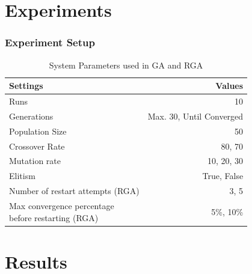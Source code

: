 \documentclass[10pt]{beamer}
\begin{document}
\section{Experiments}

\begin{frame}
	\frametitle{Experiment Setup}

	\begin{table}
		\caption{System Parameters used in GA and RGA}
		\begin{tabular}{ | l | r | }
		  \hline
		    Settings & Values \\ \hline \hline
		    Runs & 10 \\ \hline
		    Generations & Max. 30, Until Converged \\ \hline
		    Population Size & 50 \\ \hline
		    Crossover Rate & 80, 70 \\ \hline
		    Mutation rate & 10, 20, 30 \\ \hline
		    Elitism & True, False \\ \hline
		    Number of restart attempts (RGA) & 3, 5 \\ \hline
		    \shortstack{Max convergence percentage \\ before restarting (RGA)} & 5\%, 10\% \\ \hline
		\end{tabular}
	\end{table}
\end{frame}

\section{Results}
\end{document}

